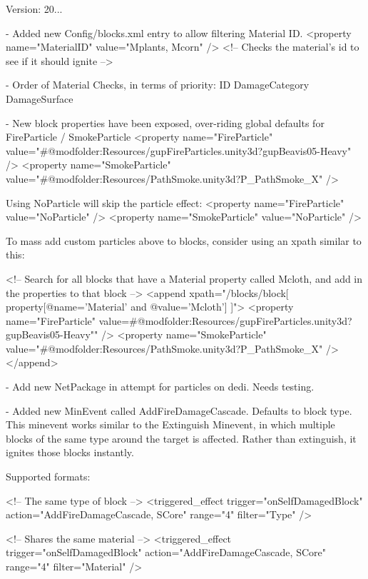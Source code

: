  Version\+: 20... \begin{DoxyVerb}[ Fire ]

    - Added new Config/blocks.xml entry to allow filtering Material ID.             
        <property name="MaterialID" value="Mplants, Mcorn" />   <!-- Checks the material's id to see if it should ignite  -->

    - Order of Material Checks, in terms of priority:
        ID
        DamageCategory
        DamageSurface

    - New block properties have been exposed, over-riding global defaults for FireParticle / SmokeParticle
        <property name="FireParticle" value="#@modfolder:Resources/gupFireParticles.unity3d?gupBeavis05-Heavy" />
        <property name="SmokeParticle" value="#@modfolder:Resources/PathSmoke.unity3d?P_PathSmoke_X" />

        Using NoParticle will skip the particle effect:
            <property name="FireParticle" value="NoParticle" />
            <property name="SmokeParticle" value="NoParticle" />

        To mass add custom particles above to blocks, consider using an xpath similar to this:

        <!-- Search for all blocks that have a Material property called Mcloth, and add in the properties to that block -->
        <append xpath="/blocks/block[ property[@name='Material' and @value='Mcloth'] ]">
            <property name="FireParticle" value=#@modfolder:Resources/gupFireParticles.unity3d?gupBeavis05-Heavy"" />   
            <property name="SmokeParticle" value="#@modfolder:Resources/PathSmoke.unity3d?P_PathSmoke_X" />
        </append>

    - Add new NetPackage in attempt for particles on dedi. Needs testing.

    - Added new MinEvent called AddFireDamageCascade. Defaults to block type.
        This minevent works similar to the Extinguish Minevent, in which multiple blocks of the same type around the target is affected. Rather than extinguish, it ignites those blocks instantly.

        Supported formats:

            <!-- The same type of block -->
            <triggered_effect trigger="onSelfDamagedBlock" action="AddFireDamageCascade, SCore" range="4" filter="Type" />

            <!-- Shares the same material -->
            <triggered_effect trigger="onSelfDamagedBlock" action="AddFireDamageCascade, SCore" range="4" filter="Material" />


\end{DoxyVerb}
